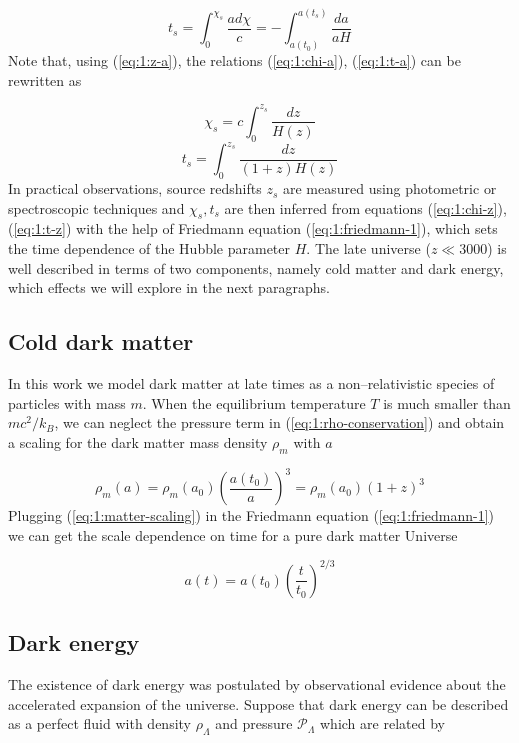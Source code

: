 \begin{equation}
\label{eq:1:t-a}
t_s = \int_{0}^{\chi_s}\frac{a d\chi}{c} = -\int_{a(t_0)}^{a(t_s)}\frac{da}{aH}  
\end{equation}
%
Note that, using (\ref{eq:1:z-a}), the relations (\ref{eq:1:chi-a}), (\ref{eq:1:t-a}) can be rewritten as 

\begin{equation}
\label{eq:1:chi-z}
\chi_s = c\int_0^{z_s}\frac{dz}{H(z)}
\end{equation} 
%
\begin{equation}
\label{eq:1:t-z}
t_s = \int_0^{z_s}\frac{dz}{(1+z)H(z)}
\end{equation} 
%
In practical observations, source redshifts $z_s$ are measured using photometric \citep{LSST} or spectroscopic \citep{DESI} techniques and $\chi_s,t_s$ are then inferred from equations (\ref{eq:1:chi-z}), (\ref{eq:1:t-z}) with the help of Friedmann equation (\ref{eq:1:friedmann-1}), which sets the time dependence of the Hubble parameter $H$. The late universe ($z\ll 3000$) is well described in terms of two components, namely cold matter and dark energy, which effects we will explore in the next paragraphs. 

\subsection{Cold dark matter}
In this work we model dark matter at late times as a non--relativistic species of particles with mass $m$. When the equilibrium temperature $T$ is much smaller than $mc^2/k_B$, we can neglect the pressure term in (\ref{eq:1:rho-conservation}) and obtain a scaling for the dark matter mass density $\rho_m$ with $a$

\begin{equation}
\label{eq:1:matter-scaling}
\rho_m(a) = \rho_m(a_0)\left(\frac{a(t_0)}{a}\right)^3 = \rho_m(a_0)(1+z)^3 
\end{equation} 
%
Plugging (\ref{eq:1:matter-scaling}) in the Friedmann equation (\ref{eq:1:friedmann-1}) we can get the scale dependence on time for a pure dark matter Universe

\begin{equation}
\label{eq:1:matter-only-a}
a(t) = a(t_0)\left(\frac{t}{t_0}\right)^{2/3}
\end{equation}

\subsection{Dark energy}
The existence of dark energy was postulated by observational evidence about the accelerated expansion of the universe. Suppose that dark energy can be described as a perfect fluid with density $\rho_\Lambda$ and pressure $\mathcal{P}_\Lambda$ which are related by

